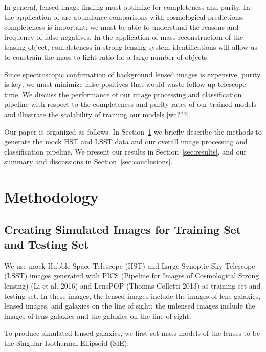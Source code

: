 \documentclass{emulateapj}
\begin{document}
In general, lensed image finding must optimize for completeness and
purity.  In the application of arc abundance comparisons with
cosmological predictions, completeness is important; we must be able
to understand the reasons and frequency of false negatives.  In the
application of mass reconstruction of the lensing object, completeness
in strong lensing system identifications will allow us to constrain
the mass-to-light ratio for a large number of objects.  

Since spectroscopic confirmation of background lensed images is
expensive, purity is key; we must minimize false positives that would
waste follow up telescope time.  We discuss the performance of our
image processing and classification pipeline with respect to the
completeness and purity rates of our trained models and illustrate the
scalability of training our models [wc???].  

Our paper is organized as follows. In Section~\ref{sec:methods} we
briefly describe the methods to generate the mock HST and LSST data
and our overall image processing and classification pipeline. We
present our results in Section~\ref{sec:results}, and our summary and
discussions in Section~\ref{sec:conclusions}.

\section{Methodology}
\label{sec:methods}
\subsection{Creating Simulated Images for Training Set and Testing Set}

We use mock Hubble Space Telescope (HST) and Large Synoptic Sky
Telescope (LSST) images generated with PICS (Pipeline for Images of
Cosmological Strong lensing) (Li et al. 2016) and LensPOP (Thomas
Colletti 2013) as training set and testing set. In these images, the
lensed images include the images of lens galaxies, lensed images, and
galaxies on the line of sight; the unlensed images include the images
of lens galaxies and the galaxies on the line of sight.

To produce simulated lensed galaxies, we first set mass models of the
lenses to be the Singular Isothermal Ellipsoid (SIE):
\end{document}
